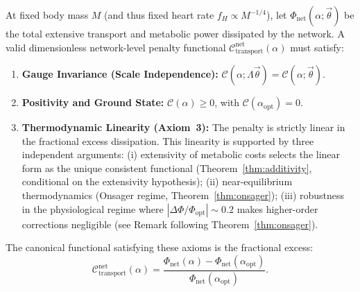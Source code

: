 \begin{theorem}
\label{thm:gauge}
At fixed body mass $M$ (and thus fixed heart rate $f_H \propto M^{-1/4}$), let
$\Phi_{\mathrm{net}}(\alpha; \vec{\theta})$ be the total extensive transport and
metabolic power dissipated by the network. A valid dimensionless network-level
penalty functional $\mathcal{C}_{\mathrm{transport}}^{\mathrm{net}}(\alpha)$
must satisfy:
\begin{enumerate}
    \item
\textbf{Gauge Invariance (Scale Independence):} $\mathcal{C}(\alpha;
\Lambda\vec{\theta}) = \mathcal{C}(\alpha; \vec{\theta})$.
    \item
\textbf{Positivity and Ground State:} $\mathcal{C}(\alpha) \ge 0$, with
$\mathcal{C}(\alpha_{\mathrm{opt}}) = 0$.
    \item
\textbf{Thermodynamic Linearity (Axiom~3):} The penalty is strictly linear in
the fractional excess dissipation. This linearity is supported by three
independent arguments: (i) extensivity of metabolic costs selects the linear
form as the unique consistent functional (Theorem~\ref{thm:additivity},
conditional on the extensivity hypothesis); (ii) near-equilibrium thermodynamics
(Onsager regime, Theorem~\ref{thm:onsager}); (iii) robustness in the
physiological regime where $|\Delta\Phi/\Phi_{\mathrm{opt}}| \sim 0.2$ makes
higher-order corrections negligible (see Remark following
Theorem~\ref{thm:onsager}).
\end{enumerate}
The canonical functional satisfying these axioms is the fractional excess:
\begin{equation}
    \mathcal{C}_{\mathrm{transport}}^{\mathrm{net}}(\alpha) =
    \frac{\Phi_{\mathrm{net}}(\alpha) - \Phi_{\mathrm{net}}(\alpha_{\mathrm{opt}})}
    {\Phi_{\mathrm{net}}(\alpha_{\mathrm{opt}})}.
    \label{eq:gauge_invariant_cost}
\end{equation}
\end{theorem}


